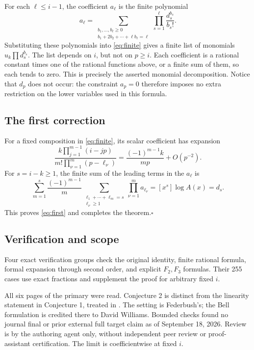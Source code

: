 \documentclass[11pt]{article}
\begin{document}
For each $\ell\le i-1$, the coefficient $a_\ell$ is the finite
polynomial
\begin{equation}\label{eq:monomials}
 a_\ell=\sum_{\substack{b_1,\ldots,b_\ell\ge0\\
                         b_1+2b_2+\cdots+\ell b_\ell=\ell}}
           \prod_{s=1}^\ell\frac{d_s^{b_s}}{b_s!}.
\end{equation}
Substituting these polynomials into \eqref{eq:finite} gives a finite
list of monomials $u_k\prod d_s^{b_s}$. The list depends on $i$,
but not on $p\ge i$. Each coefficient is a rational constant times
one of the rational functions above, or a finite sum of them, so
each tends to zero. This is precisely the asserted monomial
decomposition. Notice that $d_p$ does not occur: the constraint
$a_p=0$ therefore imposes no extra restriction on the lower variables
used in this formula.

\subsection*{The first correction}
For a fixed composition in \eqref{eq:finite}, its scalar coefficient
has expansion
\[
 \frac{k\prod_{j=1}^{m-1}(i-jp)}
        {m!\prod_{\nu=1}^m(p-\ell_\nu)}
       =\frac{(-1)^{m-1}k}{mp}+O(p^{-2}).
\]
For $s=i-k\ge1$, the finite sum of the leading terms in the
$a_\ell$ is
\[
 \sum_{m=1}^s\frac{(-1)^{m-1}}m
  \sum_{\substack{\ell_1+\cdots+\ell_m=s\\\ell_\nu\ge1}}
     \prod_{\nu=1}^m a_{\ell_\nu}
   =[x^s]\log A(x)=d_s.
\]
This proves \eqref{eq:first} and completes the theorem.\hfill$\square$

\subsection*{Verification and scope}
Four exact verification groups check the original identity, finite
rational formula, formal expansion through second order, and explicit
$F_2,F_3$ formulas. Their 255 cases use exact fractions and supplement
the proof for arbitrary fixed $i$.

All six pages of the primary were read. Conjecture 2 is distinct from
the linearity statement in Conjecture 1, treated in \cite{companion}.
The setting is Federbush's; the Bell formulation is credited there to
David Williams. Bounded checks found no journal final or prior external
full target claim as of September 18, 2026. Review is by the authoring
agent only, without independent peer review or proof-assistant
certification. The limit is coefficientwise at fixed $i$.
\end{document}

